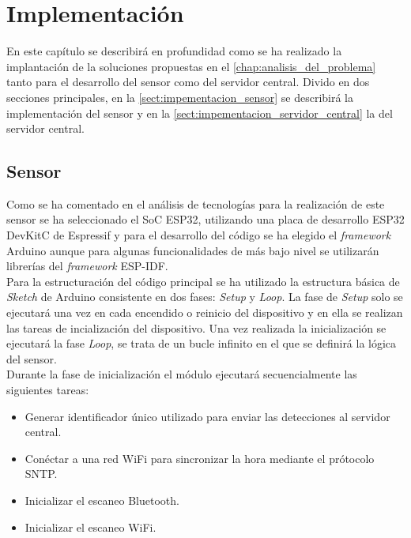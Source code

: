 \documentclass[../proyecto.tex]{subfiles}
\begin{document}
\chapter{Implementación}\label{chap:implementacion}

En este capítulo se describirá en profundidad como se ha realizado la implantación de la soluciones propuestas en el \autoref{chap:analisis_del_problema} tanto para el desarrollo del sensor como del servidor central. Divido en dos secciones principales, en la  \autoref{sect:impementacion_sensor} se describirá la implementación del sensor y en la \autoref{sect:impementacion_servidor_central} la del servidor central.\\

 \section{Sensor}\label{sect:impementacion_sensor}

Como se ha comentado en el análisis de tecnologías para la realización de este sensor se ha seleccionado el SoC ESP32, utilizando una placa de desarrollo ESP32 DevKitC de Espressif y para el desarrollo del código se ha elegido el \textit{framework} Arduino aunque para algunas funcionalidades de más bajo nivel se utilizarán librerías del \textit{framework} ESP-IDF.\\

Para la estructuración del código principal se ha utilizado la estructura básica de \textit{Sketch} de Arduino consistente en dos fases: \textit{Setup} y \textit{Loop}. La fase de \textit{Setup} solo se ejecutará una vez en cada encendido o reinicio del dispositivo y en ella se realizan las tareas de incialización del dispositivo. Una vez realizada la inicialización se ejecutará la fase \textit{Loop}, se trata de un bucle infinito en el que se definirá la lógica del sensor.\\

Durante la fase de inicialización el módulo ejecutará secuencialmente las siguientes tareas:
\begin{itemize}
  \item Generar identificador único utilizado para enviar las detecciones al servidor central.
  \item Conéctar a una red WiFi para sincronizar la hora mediante el prótocolo SNTP.
  \item Inicializar el escaneo Bluetooth.
  \item Inicializar el escaneo WiFi.
\end{itemize}
\end{document}
